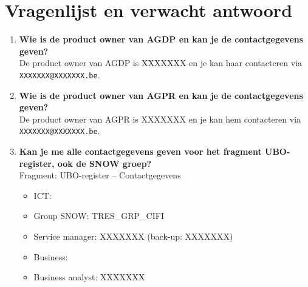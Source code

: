 \section{Vragenlijst en verwacht antwoord}
\label{vragenlijst}

\begin{enumerate}
    \item \textbf{Wie is de product owner van AGDP en kan je de contactgegevens geven?} \\
    De product owner van AGDP is XXXXXXX en je kan haar contacteren via \texttt{XXXXXXX@XXXXXXX.be}.
    
    \item \textbf{Wie is de product owner van AGPR en kan je de contactgegevens geven?} \\
    De product owner van AGPR is XXXXXXX
    en je kan hem contacteren via \texttt{XXXXXXX@XXXXXXX.be}.
    
    \item \textbf{Kan je me alle contactgegevens geven voor het fragment UBO-register, ook de SNOW groep?} \\
    Fragment: UBO-register – Contactgegevens
    \begin{itemize}
        \item ICT:
        \item Group SNOW: TRES\_GRP\_CIFI
        \item Service manager: XXXXXXX (back-up: XXXXXXX)
        \item Business:
        \item Business analyst: XXXXXXX
    \end{itemize}
    

\end{enumerate}
